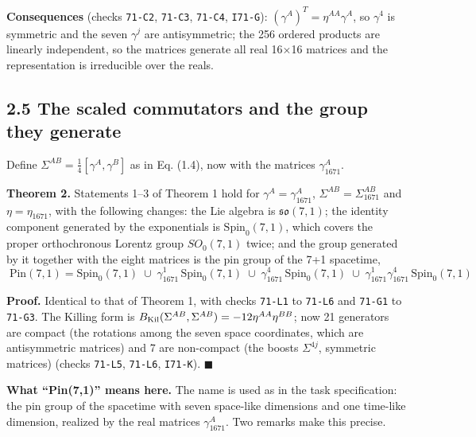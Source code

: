 \documentclass[
  10pt,
]{article}
\begin{document}
\textbf{Consequences} (checks \texttt{71-C2}, \texttt{71-C3},
\texttt{71-C4}, \texttt{I71-G}): \((\gamma^A)^T=\eta^{AA}\gamma^A\), so
\(\gamma^4\) is symmetric and the seven \(\gamma^j\) are antisymmetric;
the 256 ordered products are linearly independent, so the matrices
generate all real 16×16 matrices and the representation is irreducible
over the reals.

\hypertarget{the-scaled-commutators-and-the-group-they-generate-1}{%
\subsection{2.5 The scaled commutators and the group they
generate}\label{the-scaled-commutators-and-the-group-they-generate-1}}

Define \(\Sigma^{AB}=\frac14[\gamma^A,\gamma^B]\) as in Eq. (1.4), now
with the matrices \(\gamma_{1671}^A\).

\textbf{Theorem 2.} Statements 1--3 of Theorem 1 hold for
\(\gamma^A=\gamma_{1671}^A\), \(\Sigma^{AB}=\Sigma_{1671}^{AB}\) and
\(\eta=\eta_{1671}\), with the following changes: the Lie algebra is
\(\mathfrak{so}(7,1)\); the identity component generated by the
exponentials is \(\mathrm{Spin}_0(7,1)\), which covers the proper
orthochronous Lorentz group \(SO_0(7,1)\) twice; and the group generated
by it together with the eight matrices is the pin group of the 7+1
spacetime,
\[\boxed{\;\mathrm{Pin}(7,1)=\mathrm{Spin}_0(7,1)\;\cup\;\gamma_{1671}^1\,\mathrm{Spin}_0(7,1)\;\cup\;\gamma_{1671}^4\,\mathrm{Spin}_0(7,1)\;\cup\;\gamma_{1671}^1\gamma_{1671}^4\,\mathrm{Spin}_0(7,1)\;}\]

\textbf{Proof.} Identical to that of Theorem 1, with checks
\texttt{71-L1} to \texttt{71-L6} and \texttt{71-G1} to \texttt{71-G3}.
The Killing form is
\(B_{\rm Kil}(\Sigma^{AB},\Sigma^{AB})=-12\eta^{AA}\eta^{BB}\); now 21
generators are compact (the rotations among the seven space coordinates,
which are antisymmetric matrices) and 7 are non-compact (the boosts
\(\Sigma^{4j}\), symmetric matrices) (checks \texttt{71-L5},
\texttt{71-L6}, \texttt{I71-K}). \(\blacksquare\)

\textbf{What ``Pin(7,1)'' means here.} The name is used as in the task
specification: the pin group of the spacetime with seven space-like
dimensions and one time-like dimension, realized by the real matrices
\(\gamma_{1671}^A\). Two remarks make this precise.
\end{document}
